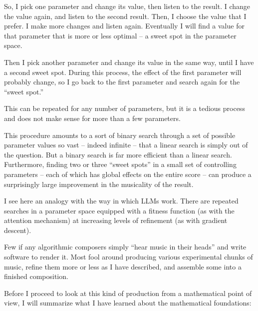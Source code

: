\documentclass[11pt,papersize=a4]{scrartcl}
\begin{document}
So, I pick one parameter and change its value, then listen to the result. I change the value again, and listen to the second result. Then, I choose the value that I prefer. I make more changes and listen again. Eventually I will find a value for that parameter that is more or less optimal – a sweet spot in the parameter space.

Then I pick another parameter and change its value in the same way, until I have a second sweet spot. During this process, the effect of the first parameter will probably change, so I go back to the first parameter and search again for the “sweet spot.”

This can be repeated for any number of parameters, but it is a tedious process and does not make sense for more than a few parameters.

This procedure amounts to a sort of binary search through a set of possible parameter values so vast – indeed infinite – that a linear search is simply out of the question. But a binary search is far more efficient than a linear search. Furthermore, finding two or three ``sweet spots'' in a small set of controlling parameters – each of which has global effects on the entire score – can produce a surprisingly large improvement in the musicality of the result.

I see here an analogy with the way in which LLMs work. There are repeated searches in a parameter space equipped with a fitness function (as with the attention mechanism) at increasing levels of refinement (as with gradient descent).

Few if any algorithmic composers simply ``hear music in their heads'' and write software to render it. Most fool around producing various experimental chunks of music, refine them more or less as I have described, and assemble some into a finished composition.

Before I proceed to look at this kind of production from a mathematical point of view, I will summarize what I have learned about the mathematical foundations:
\end{document}
